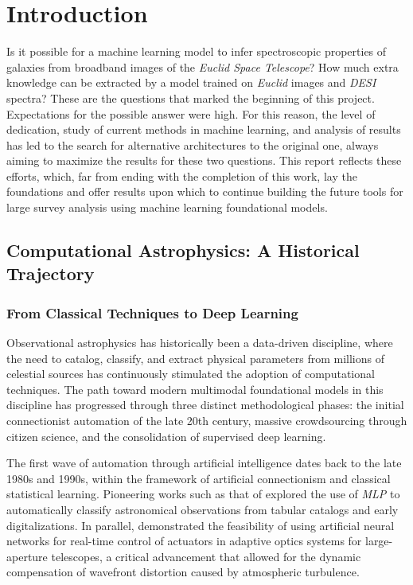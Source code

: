 
\section{Introduction}

Is it possible for a machine learning model to infer spectroscopic properties of galaxies from broadband images of the \textit{Euclid Space Telescope}? How much extra knowledge can be extracted by a model trained on \textit{Euclid} images and \textit{DESI} spectra? These are the questions that marked the beginning of this project. Expectations for the possible answer were high. For this reason, the level of dedication, study of current methods in machine learning, and analysis of results has led to the search for alternative architectures to the original one, always aiming to maximize the results for these two questions. This report reflects these efforts, which, far from ending with the completion of this work, lay the foundations and offer results upon which to continue building the future tools for large survey analysis using machine learning foundational models.


\subsection{Computational Astrophysics: A Historical Trajectory}

\subsubsection{From Classical Techniques to Deep Learning}

Observational astrophysics has historically been a data-driven discipline, where the need to catalog, classify, and extract physical parameters from millions of celestial sources has continuously stimulated the adoption of computational techniques. The path toward modern multimodal foundational models in this discipline has progressed through three distinct methodological phases: the initial connectionist automation of the late 20th century, massive crowdsourcing through citizen science, and the consolidation of supervised deep learning.

The first wave of automation through artificial intelligence dates back to the late 1980s and 1990s, within the framework of artificial connectionism and classical statistical learning. Pioneering works such as that of \textcite{ar:adorf-1988} explored the use of \textit{\gls{MLP}} to automatically classify astronomical observations from tabular catalogs and early digitalizations. In parallel, \textcite{ar:angel-1990} demonstrated the feasibility of using artificial neural networks for real-time control of actuators in adaptive optics systems for large-aperture telescopes, a critical advancement that allowed for the dynamic compensation of wavefront distortion caused by atmospheric turbulence.

